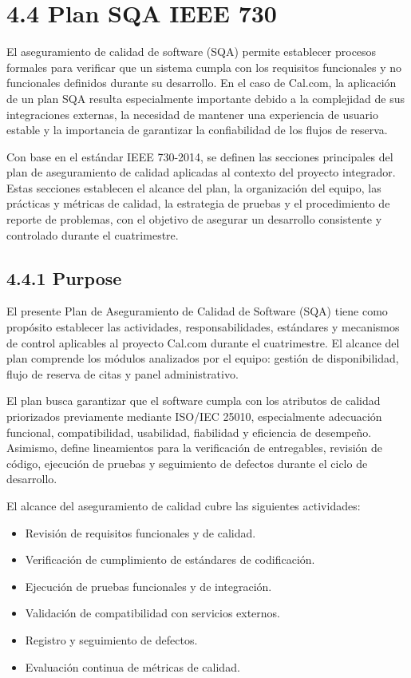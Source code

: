 \documentclass[12pt,a4paper]{article}
\begin{document}
\section{4.4 Plan SQA IEEE 730}

El aseguramiento de calidad de software (SQA) permite establecer procesos formales para verificar que un sistema cumpla con los requisitos funcionales y no funcionales definidos durante su desarrollo. En el caso de Cal.com, la aplicación de un plan SQA resulta especialmente importante debido a la complejidad de sus integraciones externas, la necesidad de mantener una experiencia de usuario estable y la importancia de garantizar la confiabilidad de los flujos de reserva.

Con base en el estándar IEEE 730-2014, se definen las secciones principales del plan de aseguramiento de calidad aplicadas al contexto del proyecto integrador. Estas secciones establecen el alcance del plan, la organización del equipo, las prácticas y métricas de calidad, la estrategia de pruebas y el procedimiento de reporte de problemas, con el objetivo de asegurar un desarrollo consistente y controlado durante el cuatrimestre.

\subsection{4.4.1 Purpose}

El presente Plan de Aseguramiento de Calidad de Software (SQA) tiene como propósito establecer las actividades, responsabilidades, estándares y mecanismos de control aplicables al proyecto Cal.com durante el cuatrimestre. El alcance del plan comprende los módulos analizados por el equipo: gestión de disponibilidad, flujo de reserva de citas y panel administrativo.

El plan busca garantizar que el software cumpla con los atributos de calidad priorizados previamente mediante ISO/IEC 25010, especialmente adecuación funcional, compatibilidad, usabilidad, fiabilidad y eficiencia de desempeño. Asimismo, define lineamientos para la verificación de entregables, revisión de código, ejecución de pruebas y seguimiento de defectos durante el ciclo de desarrollo.

El alcance del aseguramiento de calidad cubre las siguientes actividades:

\begin{itemize}
    \item Revisión de requisitos funcionales y de calidad.
    \item Verificación de cumplimiento de estándares de codificación.
    \item Ejecución de pruebas funcionales y de integración.
    \item Validación de compatibilidad con servicios externos.
    \item Registro y seguimiento de defectos.
    \item Evaluación continua de métricas de calidad.
\end{itemize}
\end{document}
